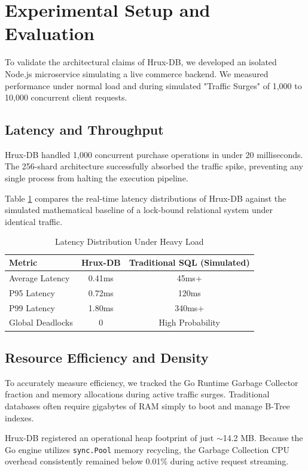 \documentclass[10pt,twocolumn,letterpaper]{article}
\begin{document}
\section{Experimental Setup and Evaluation}

To validate the architectural claims of Hrux-DB, we developed an isolated Node.js microservice simulating a live commerce backend. We measured performance under normal load and during simulated "Traffic Surges" of 1,000 to 10,000 concurrent client requests.

\subsection{Latency and Throughput}

Hrux-DB handled 1,000 concurrent purchase operations in under 20 milliseconds. The 256-shard architecture successfully absorbed the traffic spike, preventing any single process from halting the execution pipeline. 

Table \ref{tab:latency} compares the real-time latency distributions of Hrux-DB against the simulated mathematical baseline of a lock-bound relational system under identical traffic.

\begin{table}[H]
\centering
\caption{Latency Distribution Under Heavy Load}
\label{tab:latency}
\begin{tabular}{@{}lcc@{}}
\toprule
\textbf{Metric} & \textbf{Hrux-DB} & \textbf{Traditional SQL (Simulated)} \\ \midrule
Average Latency & 0.41ms & 45ms+ \\
P95 Latency & 0.72ms & 120ms \\
P99 Latency & 1.80ms & 340ms+ \\
Global Deadlocks & 0 & High Probability \\ \bottomrule
\end{tabular}
\end{table}

\subsection{Resource Efficiency and Density}

To accurately measure efficiency, we tracked the Go Runtime Garbage Collector fraction and memory allocations during active traffic surges. Traditional databases often require gigabytes of RAM simply to boot and manage B-Tree indexes.

Hrux-DB registered an operational heap footprint of just $\sim$14.2 MB. Because the Go engine utilizes \texttt{sync.Pool} memory recycling, the Garbage Collection CPU overhead consistently remained below 0.01\% during active request streaming. 
\end{document}
